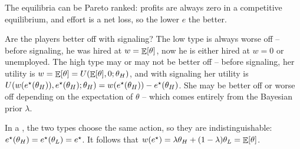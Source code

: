 \documentclass[12pt]{article}
\begin{document}
\begin{remark}
	The equilibria can be Pareto ranked: profits are always zero in a competitive equilibrium, and effort is a net loss, so the lower $e$ the better. 
\end{remark}

\begin{question}
	Are the players better off with signaling? The low type is always worse off -- before signaling, he was hired at $w = \mathop{\mathbb{E}}[\theta]$, now he is either hired at $w = 0$ or unemployed. The high type may or may not be better off -- before signaling, her utility is $w = \mathop{\mathbb{E}}[\theta] = U(\mathop{\mathbb{E}}[\theta],0;\theta_H)$, and with signaling her utility is $U(w(e^\star(\theta_H)),e^\star(\theta_H);\theta_H) = w(e^\star(\theta_H)) - e^\star(\theta_H)$. She may be better off or worse off depending on the expectation of $\theta$ -- which comes entirely from the Bayesian prior $\lambda$.
\end{question}

\begin{definition}
	In a , the two types choose the same action, so they are indistinguishable: $e^\star(\theta_H) = e^\star(\theta_L) = e^\star$. It follows that $w(e^\star) = \lambda \theta_H + (1-\lambda)\theta_L = \mathop{\mathbb{E}}[\theta]$. 
\end{definition}
\end{document}
